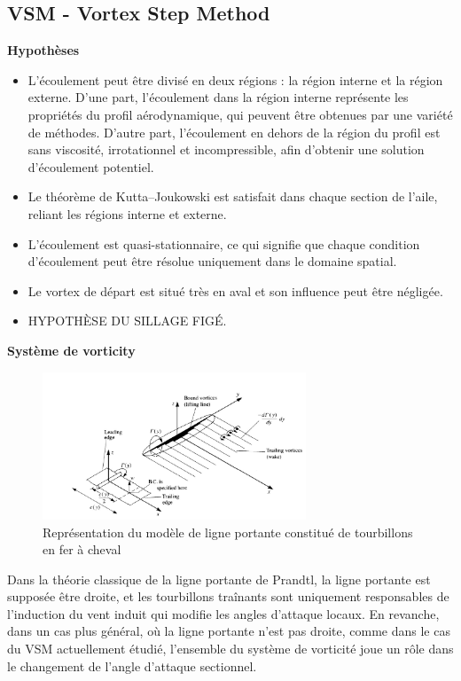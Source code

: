 \subsection{VSM - Vortex Step Method} 
\label{subsec:Ch1.2.2}

\textbf{Hypothèses} \\
\begin{itemize}
    \item L'écoulement peut être divisé en deux régions : la région interne et la région externe. D'une part, l'écoulement dans la région interne représente les propriétés du profil aérodynamique, qui peuvent être obtenues par une variété de méthodes. D'autre part, l'écoulement en dehors de la région du profil est sans viscosité, irrotationnel et incompressible, afin d'obtenir une solution d'écoulement potentiel.
    \item Le théorème de Kutta–Joukowski est satisfait dans chaque section de l'aile, reliant les régions interne et externe.
    \item L'écoulement est quasi-stationnaire, ce qui signifie que chaque condition d'écoulement peut être résolue uniquement dans le domaine spatial.
    \item Le vortex de départ est situé très en aval et son influence peut être négligée.
    \item HYPOTHÈSE DU SILLAGE FIGÉ.
\end{itemize}

\textbf{Système de vorticity}
\begin{figure}[H]
    \centering
    \includegraphics[width=0.7\textwidth]{Pics/01 - Basses Fidélités/vortex VSM.png}
    \caption{Représentation du modèle de ligne portante constitué de tourbillons en fer à cheval}
    \label{fig: vortex vsm}
\end{figure}


Dans la théorie classique de la ligne portante de Prandtl, la ligne portante est supposée être droite, et les tourbillons traînants sont uniquement responsables de l'induction du vent induit qui modifie les angles d'attaque locaux. En revanche, dans un cas plus général, où la ligne portante n'est pas droite, comme dans le cas du VSM actuellement étudié, l'ensemble du système de vorticité joue un rôle dans le changement de l'angle d'attaque sectionnel.\\

